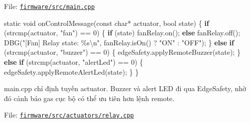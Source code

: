 \documentclass[11pt,oneside,openany]{book}
\renewcommand{\texttt}[1]{{\ttfamily\small #1}}
\newenvironment{Shaded}{\begin{snugshade}}{\end{snugshade}}
\newcommand{\AttributeTok}[1]{\textcolor[rgb]{0.16,0.50,0.73}{#1}}
\newcommand{\ControlFlowTok}[1]{\textcolor[rgb]{0.99,0.74,0.29}{\textbf{#1}}}
\newcommand{\DataTypeTok}[1]{\textcolor[rgb]{0.16,0.50,0.73}{#1}}
\newcommand{\DecValTok}[1]{\textcolor[rgb]{0.96,0.45,0.00}{#1}}
\newcommand{\NormalTok}[1]{\textcolor[rgb]{0.81,0.81,0.76}{#1}}
\newcommand{\OperatorTok}[1]{\textcolor[rgb]{0.81,0.81,0.76}{#1}}
\newcommand{\SpecialCharTok}[1]{\textcolor[rgb]{0.24,0.68,0.91}{#1}}
\newcommand{\StringTok}[1]{\textcolor[rgb]{0.96,0.31,0.31}{#1}}
\renewenvironment{Shaded}{%
  \def\FrameCommand{\fboxsep=8pt\colorbox{shadecolor}}%
  \MakeFramed{\advance\hsize-\width\FrameRestore}%
}{\endMakeFramed}
\begin{document}
File: \href{../firmware/src/main.cpp}{\nolinkurl{firmware/src/main.cpp}}

\begin{Shaded}
\begin{Highlighting}[]
\AttributeTok{static} \DataTypeTok{void}\NormalTok{ onControlMessage}\OperatorTok{(}\AttributeTok{const} \DataTypeTok{char}\OperatorTok{*}\NormalTok{ actuator}\OperatorTok{,} \DataTypeTok{bool}\NormalTok{ state}\OperatorTok{)} \OperatorTok{\{}
  \ControlFlowTok{if} \OperatorTok{(}\NormalTok{strcmp}\OperatorTok{(}\NormalTok{actuator}\OperatorTok{,} \StringTok{"fan"}\OperatorTok{)} \OperatorTok{==} \DecValTok{0}\OperatorTok{)} \OperatorTok{\{}
    \ControlFlowTok{if} \OperatorTok{(}\NormalTok{state}\OperatorTok{)}\NormalTok{ fanRelay}\OperatorTok{.}\NormalTok{on}\OperatorTok{();}
    \ControlFlowTok{else}\NormalTok{ fanRelay}\OperatorTok{.}\NormalTok{off}\OperatorTok{();}
\NormalTok{    DBG}\OperatorTok{(}\StringTok{"[Fan] Relay state: }\SpecialCharTok{\%s\textbackslash{}n}\StringTok{"}\OperatorTok{,}\NormalTok{ fanRelay}\OperatorTok{.}\NormalTok{isOn}\OperatorTok{()} \OperatorTok{?} \StringTok{"ON"} \OperatorTok{:} \StringTok{"OFF"}\OperatorTok{);}
  \OperatorTok{\}} \ControlFlowTok{else} \ControlFlowTok{if} \OperatorTok{(}\NormalTok{strcmp}\OperatorTok{(}\NormalTok{actuator}\OperatorTok{,} \StringTok{"buzzer"}\OperatorTok{)} \OperatorTok{==} \DecValTok{0}\OperatorTok{)} \OperatorTok{\{}
\NormalTok{    edgeSafety}\OperatorTok{.}\NormalTok{applyRemoteBuzzer}\OperatorTok{(}\NormalTok{state}\OperatorTok{);}
  \OperatorTok{\}} \ControlFlowTok{else} \ControlFlowTok{if} \OperatorTok{(}\NormalTok{strcmp}\OperatorTok{(}\NormalTok{actuator}\OperatorTok{,} \StringTok{"alertLed"}\OperatorTok{)} \OperatorTok{==} \DecValTok{0}\OperatorTok{)} \OperatorTok{\{}
\NormalTok{    edgeSafety}\OperatorTok{.}\NormalTok{applyRemoteAlertLed}\OperatorTok{(}\NormalTok{state}\OperatorTok{);}
  \OperatorTok{\}}
\OperatorTok{\}}
\end{Highlighting}
\end{Shaded}

\texttt{main.cpp} chỉ định tuyến actuator. Buzzer và alert LED đi qua
\texttt{EdgeSafety}, nhờ đó cảnh báo gas cục bộ có thể ưu tiên hơn lệnh
remote.

File:
\href{../firmware/src/actuators/relay.cpp}{\nolinkurl{firmware/src/actuators/relay.cpp}}
\end{document}
